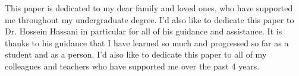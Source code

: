 \dedication{2023}{
    This paper is dedicated to my dear family and loved ones, who have supported me throughout my undergraduate degree.
    \vspace{0.25cm}
    \newendline I’d also like to dedicate this paper to Dr. Hossein Hassani in particular for all of his guidance and assistance. It is thanks to his guidance that I have learned so much and progressed so far as a student and as a person.
    \vspace{0.25cm}
    \newendline I'd also like to dedicate this paper to all of my colleagues and teachers who have supported me over the past 4 years.
}